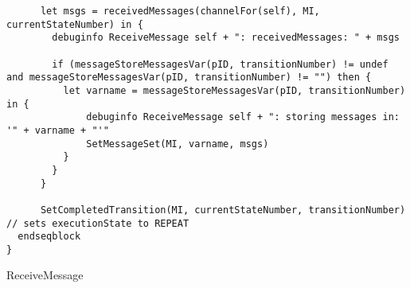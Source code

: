 \begin{listing}[H]
\begin{verbatim}
      let msgs = receivedMessages(channelFor(self), MI, currentStateNumber) in {
        debuginfo ReceiveMessage self + ": receivedMessages: " + msgs

        if (messageStoreMessagesVar(pID, transitionNumber) != undef and messageStoreMessagesVar(pID, transitionNumber) != "") then {
          let varname = messageStoreMessagesVar(pID, transitionNumber) in {
              debuginfo ReceiveMessage self + ": storing messages in: '" + varname + "'"
              SetMessageSet(MI, varname, msgs)
          }
        }
      }

      SetCompletedTransition(MI, currentStateNumber, transitionNumber) // sets executionState to REPEAT
  endseqblock
}
\end{verbatim}
\caption{ReceiveMessage}
\label{lst:asm:ReceiveMessage}
\end{listing}




